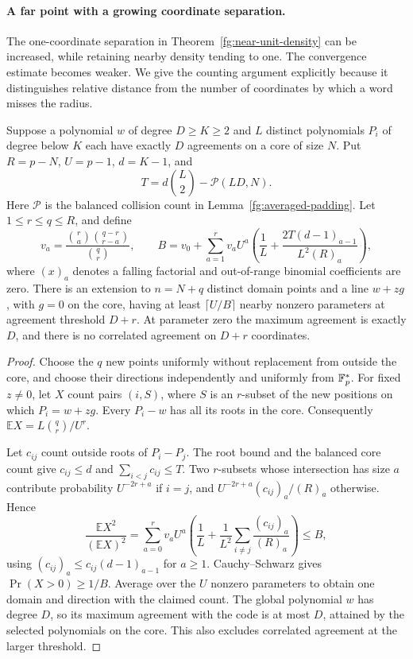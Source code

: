 \paragraph{A far point with a growing coordinate separation.}
The one-coordinate separation in Theorem~\ref{fg:near-unit-density}
can be increased, while retaining nearby density tending to one.
The convergence estimate becomes weaker. We give the counting argument
explicitly because it distinguishes relative distance from the number
of coordinates by which a word misses the radius.

\begin{lemma}\label{fg:multi-padding}
Suppose a polynomial $w$ of degree $D\ge K\ge2$ and $L$ distinct
polynomials $P_i$ of degree below $K$ each have exactly $D$ agreements
on a core of size $N$. Put $R=p-N$, $U=p-1$, $d=K-1$, and
\[
 T=d\binom L2-\mathcal P(LD,N).
\]
Here $\mathcal P$ is the balanced collision count in
Lemma~\ref{fg:averaged-padding}. Let $1\le r\le q\le R$, and define
\[
 v_a=\frac{\binom ra\binom{q-r}{r-a}}{\binom qr},\qquad
 B=v_0+\sum_{a=1}^r v_a U^a
 \left(\frac1L+\frac{2T(d-1)_{a-1}}{L^2(R)_a}\right),
\]
where $(x)_a$ denotes a falling factorial and out-of-range binomial
coefficients are zero. There is an extension to $n=N+q$ distinct
domain points and a line $w+zg$, with $g=0$ on the core, having at
least $\lceil U/B\rceil$ nearby nonzero parameters at agreement
threshold $D+r$. At parameter zero the maximum agreement is exactly
$D$, and there is no correlated agreement on $D+r$ coordinates.
\end{lemma}
\begin{proof}
Choose the $q$ new points uniformly without replacement from outside
the core, and choose their directions independently and uniformly
from $\mathbb F_p^*$. For fixed $z\ne0$, let $X$ count pairs $(i,S)$,
where $S$ is an $r$-subset of the new positions on which $P_i=w+zg$.
Every $P_i-w$ has all its roots in the core. Consequently
$\mathbb EX=L\binom qr/U^r$.

Let $c_{ij}$ count outside roots of $P_i-P_j$. The root bound and
the balanced core count give $c_{ij}\le d$ and
$\sum_{i<j}c_{ij}\le T$. Two $r$-subsets whose intersection has size
$a$ contribute probability $U^{-2r+a}$ if $i=j$, and
$U^{-2r+a}(c_{ij})_a/(R)_a$ otherwise. Hence
\[
 \frac{\mathbb EX^2}{(\mathbb EX)^2}
 =\sum_{a=0}^r v_aU^a
 \left(\frac1L+\frac1{L^2}\sum_{i\ne j}\frac{(c_{ij})_a}{(R)_a}\right)
 \le B,
\]
using $(c_{ij})_a\le c_{ij}(d-1)_{a-1}$ for $a\ge1$.
Cauchy--Schwarz gives $\Pr(X>0)\ge1/B$. Average over the $U$
nonzero parameters to obtain one domain and direction with the
claimed count. The global polynomial $w$ has degree $D$, so its
maximum agreement with the code is at most $D$, attained by the
selected polynomials on the core. This also excludes correlated
agreement at the larger threshold.
\end{proof}

